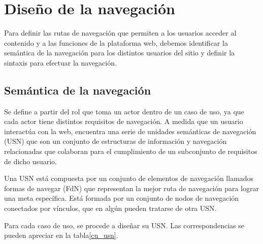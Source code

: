 
\section{Diseño de la navegación}
Para definir las rutas de navegación que permiten a los usuarios acceder al contenido y a las funciones de la plataforma web, debemos identificar la semántica de la navegación para los distintos usuarios del sitio y definir la sintaxis para efectuar la navegación.


\subsection{Semántica de la navegación}
Se define a partir del rol que toma un actor dentro de un caso de uso, ya que cada actor tiene distintos requisitos de navegación. A medida que un usuario interactúa con la web, encuentra una serie de unidades semánticas de navegación (USN) que son un conjunto de estructuras de información y navegación relacionadas que colaboran para el cumplimiento de un subconjunto de requisitos de dicho usuario.


Una USN está compuesta por un conjunto de elementos de navegación llamados formas de navegar (FdN) que representan la mejor ruta de navegación para lograr una meta específica. Está formada por un conjunto de nodos de navegación conectados por vínculos, que en algún pueden tratarse de otra USN.


Para cada caso de uso, se procede a diseñar su USN. Las correspondencias se pueden apreciar en la tabla\ref{cu_usn}.


